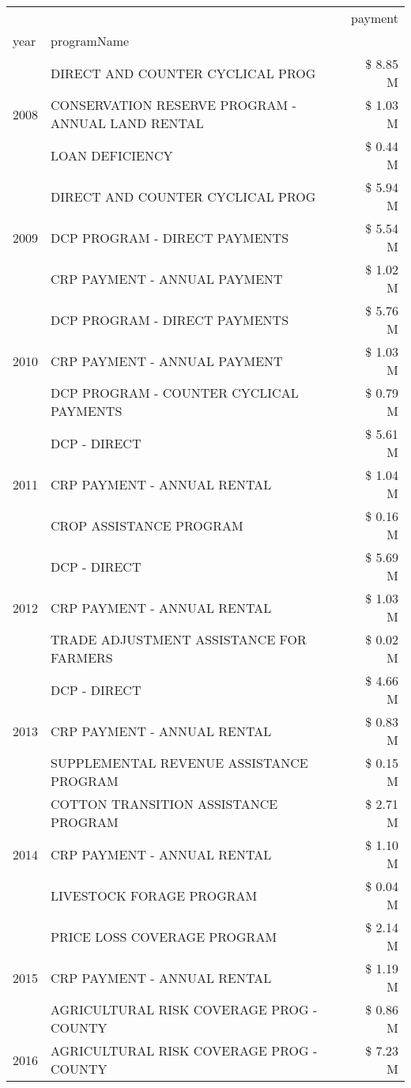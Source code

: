 \begin{tabular}{llr}
\toprule
 &  & payment \\
year & programName &  \\
\midrule
\multirow[t]{3}{*}{2008} & DIRECT AND COUNTER CYCLICAL PROG & \$ 8.85 M \\
 & CONSERVATION RESERVE PROGRAM - ANNUAL LAND RENTAL & \$ 1.03 M \\
 & LOAN DEFICIENCY & \$ 0.44 M \\
\cline{1-3}
\multirow[t]{3}{*}{2009} & DIRECT AND COUNTER CYCLICAL PROG & \$ 5.94 M \\
 & DCP PROGRAM - DIRECT PAYMENTS & \$ 5.54 M \\
 & CRP PAYMENT - ANNUAL PAYMENT & \$ 1.02 M \\
\cline{1-3}
\multirow[t]{3}{*}{2010} & DCP PROGRAM - DIRECT PAYMENTS & \$ 5.76 M \\
 & CRP PAYMENT - ANNUAL PAYMENT & \$ 1.03 M \\
 & DCP PROGRAM - COUNTER CYCLICAL PAYMENTS & \$ 0.79 M \\
\cline{1-3}
\multirow[t]{3}{*}{2011} & DCP - DIRECT & \$ 5.61 M \\
 & CRP PAYMENT - ANNUAL RENTAL & \$ 1.04 M \\
 & CROP ASSISTANCE PROGRAM & \$ 0.16 M \\
\cline{1-3}
\multirow[t]{3}{*}{2012} & DCP - DIRECT & \$ 5.69 M \\
 & CRP PAYMENT - ANNUAL RENTAL & \$ 1.03 M \\
 & TRADE ADJUSTMENT ASSISTANCE FOR FARMERS & \$ 0.02 M \\
\cline{1-3}
\multirow[t]{3}{*}{2013} & DCP - DIRECT & \$ 4.66 M \\
 & CRP PAYMENT - ANNUAL RENTAL & \$ 0.83 M \\
 & SUPPLEMENTAL REVENUE ASSISTANCE PROGRAM & \$ 0.15 M \\
\cline{1-3}
\multirow[t]{3}{*}{2014} & COTTON TRANSITION ASSISTANCE PROGRAM & \$ 2.71 M \\
 & CRP PAYMENT - ANNUAL RENTAL & \$ 1.10 M \\
 & LIVESTOCK FORAGE PROGRAM & \$ 0.04 M \\
\cline{1-3}
\multirow[t]{3}{*}{2015} & PRICE LOSS COVERAGE PROGRAM & \$ 2.14 M \\
 & CRP PAYMENT - ANNUAL RENTAL & \$ 1.19 M \\
 & AGRICULTURAL RISK COVERAGE PROG - COUNTY & \$ 0.86 M \\
\cline{1-3}
\multirow[t]{3}{*}{2016} & AGRICULTURAL RISK COVERAGE PROG - COUNTY & \$ 7.23 M \\

\end{tabular}
